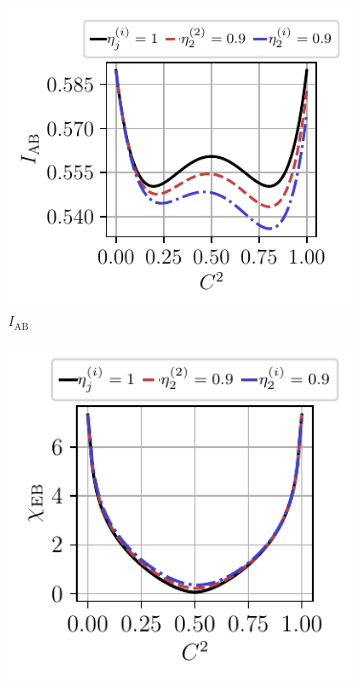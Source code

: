 \documentclass[%
reprint,
superscriptaddress,
 amsmath,amssymb,amsfonts,
 aps,
 pra,
 longbibliography
]{revtex4-2}
\newcommand{\ind}[1]{\mathrm{#1}}
\begin{document}
\begin{figure}
    \centering
    \begin{subfigure}[c]{.3\linewidth}
\includegraphics[width=\linewidth, trim={.2cm .3cm .4cm .35cm},clip]{pics/qkd/dhom/IAB.pdf}
\caption[]{$I_{\ind{AB}}$}
        \end{subfigure}
\hfill
        \begin{subfigure}[c]{.3\linewidth}
 \includegraphics[width=\linewidth, trim={.2cm .3cm .4cm .35cm},clip]{pics/qkd/dhom/chi.pdf}

\end{subfigure}
\end{figure}
\end{document}
